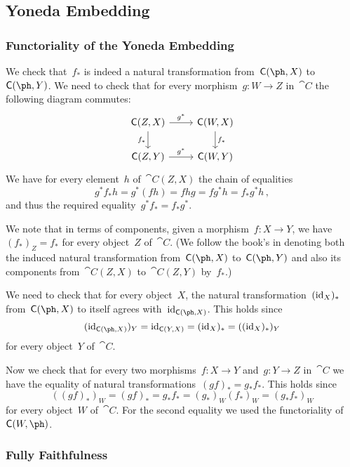 \subsection{Yoneda Embedding}



\subsubsection{Functoriality of the Yoneda Embedding}

We check that~$f_*$ is indeed a natural transformation from~$\cat{C}(\ph, X)$ to~$\cat{C}(\ph, Y)$.
We need to check that for every morphism~$g \colon W \to Z$ in~$\cat{C}$ the following diagram commutes:
\[
	\begin{tikzcd}
		\cat{C}(Z, X)
		\arrow{r}[above]{g^*}
		\arrow{d}[left]{f_*}
		&
		\cat{C}(W, X)
		\arrow{d}[right]{f_*}
		\\
		\cat{C}(Z, Y)
		\arrow{r}[above]{g^*}
		&
		\cat{C}(W, Y)
	\end{tikzcd}
\]
We have for every element~$h$ of~$\cat{C}(Z, X)$ the chain of equalities
\[
	g^* f_* h
	=
	g^* (f h)
	=
	f h g
	=
	f g^* h
	=
	f_* g^* h \,,
\]
and thus the required equality~$g^* f_* = f_* g^*$.

We note that in terms of components, given a morphism~$f \colon X \to Y$, we have~$(f_*)_Z = f_*$ for every object~$Z$ of~$\cat{C}$.
(We follow the book’s in denoting both the induced natural transformation from~$\cat{C}(\ph, X)$ to~$\cat{C}(\ph, Y)$ and also its components from~$\cat{C}(Z, X)$ to~$\cat{C}(Z, Y)$ by~$f_*$.)

We need to check that for every object~$X$, the natural transformation~$(\operatorname{id}_X)_*$ from~$\cat{C}(\ph, X)$ to itself agrees with~$\id_{\cat{C}(\ph, X)}$.
This holds since
\[
	( \id_{\cat{C}(\ph, X)} )_Y
	=
	\id_{\cat{C}(Y, X)}
	=
	(\id_X)_*
	=
	((\id_X)_*)_Y
\]
for every object~$Y$ of~$\cat{C}$.

Now we check that for every two morphisms~$f \colon X \to Y$ and~$g \colon Y \to Z$ in~$\cat{C}$ we have the equality of natural transformations~$(g f)_* = g_* f_*$.
This holds since
\[
	((g f)_*)_W
	=
	(g f)_*
	=
	g_* f_*
	=
	(g_*)_W (f_*)_W
	=
	( g_* f_* )_W
\]
for every object~$W$ of~$\cat{C}$.
For the second equality we used the functoriality of~$\cat{C}(W, \ph)$.



\subsubsection{Fully Faithfulness}

